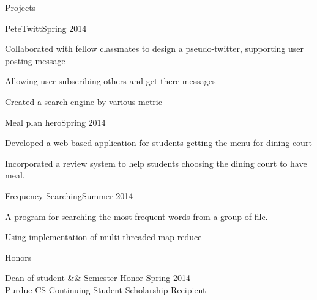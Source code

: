 \documentclass{resume} %
\begin{document}

\begin{rSection}{Projects}
\begin{rSubsection}{PeteTwitt}{Spring 2014}{}{}
\item Collaborated with fellow classmates to design a pseudo-twitter, supporting user posting message
\item Allowing user subscribing others and get there messages
\item Created a search engine by various metric
\end{rSubsection}

\begin{rSubsection}{Meal plan hero}{Spring 2014}{}{}
\item Developed a web based application for students getting the menu for dining court
\item Incorporated a review system to help students choosing the dining court to have meal.
\end{rSubsection}

\begin{rSubsection}{Frequency Searching}{Summer 2014}{}{}
\item A program for searching the most frequent words from a group of file.
\item Using implementation of multi-threaded map-reduce
\end{rSubsection}


\end{rSection}

\begin{rSection}{Honors}{}{}


Dean of student \&\& Semester Honor  \hspace{100mm} Spring 2014\\ 
Purdue CS Continuing Student Scholarship Recipient 


\end{rSection}

\end{document}
